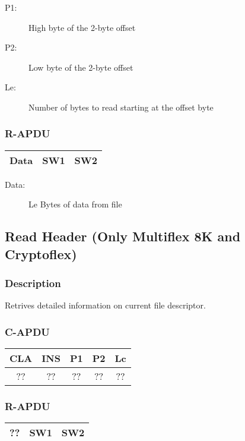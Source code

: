 \documentclass[a4paper,oneside]{article}
\begin{document}
\begin{description}
\item[P1:] High byte of the 2-byte offset
\item[P2:] Low byte of the 2-byte offset
\item[Le:] Number of bytes to read starting at the offset byte
\end{description}

\subsubsection*{R-APDU}

\begin{tabular}{|c|c|c|} \hline
Data & SW1 & SW2 \\ \hline
\end{tabular}

\begin{description}
\item[Data:] Le Bytes of data from file
\end{description}


\subsection{Read Header (Only Multiflex 8K and Cryptoflex)}

\subsubsection*{Description}

Retrives detailed information on current file descriptor.

\subsubsection*{C-APDU}

\begin{tabular}{|c|c|c|c|c|} \hline
CLA & INS & P1 & P2 & Lc \\ \hline \hline
?? & ?? & ?? & ?? & ?? \\ \hline
\end{tabular}

\subsubsection*{R-APDU}

\begin{tabular}{|c|c|c|} \hline
?? & SW1 & SW2 \\ \hline
\end{tabular}
\end{document}
